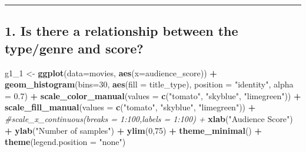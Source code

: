 \documentclass[]{article}
\newenvironment{Shaded}{\begin{snugshade}}{\end{snugshade}}
\newcommand{\KeywordTok}[1]{\textcolor[rgb]{0.13,0.29,0.53}{\textbf{#1}}}
\newcommand{\DataTypeTok}[1]{\textcolor[rgb]{0.13,0.29,0.53}{#1}}
\newcommand{\DecValTok}[1]{\textcolor[rgb]{0.00,0.00,0.81}{#1}}
\newcommand{\FloatTok}[1]{\textcolor[rgb]{0.00,0.00,0.81}{#1}}
\newcommand{\StringTok}[1]{\textcolor[rgb]{0.31,0.60,0.02}{#1}}
\newcommand{\CommentTok}[1]{\textcolor[rgb]{0.56,0.35,0.01}{\textit{#1}}}
\newcommand{\OperatorTok}[1]{\textcolor[rgb]{0.81,0.36,0.00}{\textbf{#1}}}
\newcommand{\NormalTok}[1]{#1}
\begin{document}
\begin{center}\rule{0.5\linewidth}{\linethickness}\end{center}

\subsection{1. Is there a relationship between the type/genre and
score?}\label{is-there-a-relationship-between-the-typegenre-and-score-1}

\begin{Shaded}
\begin{Highlighting}[]
\NormalTok{g1_}\DecValTok{1}\NormalTok{ <-}\StringTok{ }\KeywordTok{ggplot}\NormalTok{(}\DataTypeTok{data=}\NormalTok{movies, }\KeywordTok{aes}\NormalTok{(}\DataTypeTok{x=}\NormalTok{audience_score)) }\OperatorTok{+}
\StringTok{  }\KeywordTok{geom_histogram}\NormalTok{(}\DataTypeTok{bins=}\DecValTok{30}\NormalTok{, }\KeywordTok{aes}\NormalTok{(}\DataTypeTok{fill =}\NormalTok{ title_type), }\DataTypeTok{position =} \StringTok{"identity"}\NormalTok{, }\DataTypeTok{alpha =} \FloatTok{0.7}\NormalTok{) }\OperatorTok{+}
\StringTok{  }\KeywordTok{scale_color_manual}\NormalTok{(}\DataTypeTok{values =} \KeywordTok{c}\NormalTok{(}\StringTok{"tomato"}\NormalTok{, }\StringTok{"skyblue"}\NormalTok{, }\StringTok{"limegreen"}\NormalTok{)) }\OperatorTok{+}
\StringTok{  }\KeywordTok{scale_fill_manual}\NormalTok{(}\DataTypeTok{values =} \KeywordTok{c}\NormalTok{(}\StringTok{"tomato"}\NormalTok{, }\StringTok{"skyblue"}\NormalTok{, }\StringTok{"limegreen"}\NormalTok{)) }\OperatorTok{+}
\StringTok{  }\CommentTok{#scale_x_continuous(breaks = 1:100,labels = 1:100) + }
\StringTok{  }\KeywordTok{xlab}\NormalTok{(}\StringTok{"Audience Score"}\NormalTok{) }\OperatorTok{+}
\StringTok{  }\KeywordTok{ylab}\NormalTok{(}\StringTok{"Number of samples"}\NormalTok{) }\OperatorTok{+}
\StringTok{  }\KeywordTok{ylim}\NormalTok{(}\DecValTok{0}\NormalTok{,}\DecValTok{75}\NormalTok{) }\OperatorTok{+}
\StringTok{  }\KeywordTok{theme_minimal}\NormalTok{() }\OperatorTok{+}
\StringTok{  }\KeywordTok{theme}\NormalTok{(}\DataTypeTok{legend.position =} \StringTok{"none"}\NormalTok{)}


\end{Highlighting}
\end{Shaded}
\end{document}
